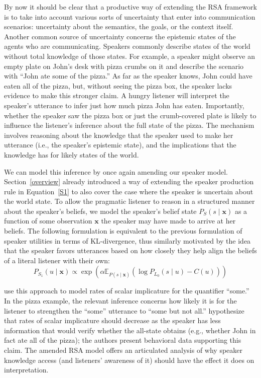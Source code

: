 \documentclass[10pt,letterpaper]{article}
\begin{document}
By now it should be clear that a productive way of extending the RSA framework is to take into account various sorts of uncertainty that enter into communication scenarios: uncertainty about the semantics, the goals, or the context itself. Another common source of uncertainty concerns the epistemic states of the agents who are communicating. Speakers commonly describe states of the world without total knowledge of those states. For example, a speaker might observe an empty plate on John's desk with pizza crumbs on it and describe the scenario with ``John ate some of the pizza.'' As far as the speaker knows, John could have eaten all of the pizza, but, without seeing the pizza box, the speaker lacks evidence to make this stronger claim. A hungry listener will interpret the speaker's utterance to infer just how much pizza John has eaten. Importantly, whether the speaker saw the pizza box or just the crumb-covered plate is likely to influence the listener's inference about the full state of the pizza. The mechanism involves reasoning about the knowledge that the speaker used to make her utterance (i.e., the speaker's epistemic state), and the implications that the knowledge has for likely states of the world.

We can model this inference by once again amending our speaker model.
Section~\ref{overview} already introduced a way of extending the speaker production rule in Equation~\eqref{S1} to also cover the case where the speaker is uncertain about the world state.
To allow the pragmatic listener to reason in a structured manner about the speaker's beliefs, we model the speaker's belief state $P_{S}(s \mid \textbf{x})$ as a function of some observation $\textbf{x}$ the speaker may have made to arrive at her beliefs.
The following formulation is equivalent to the previous formulation of speaker utilities in terms of KL-divergence, thus similarly motivated by the idea that the speaker favors utterances based on how closely they help align the beliefs of a literal listener with their own:
%
\begin{equation} \label{S1-epistemic}
P_{S_1}(u\mid \textbf{x}) \propto \exp (\alpha \mathbb{E}_{P(s\mid \textbf{x})}(\log P_{L_0}(s\mid u) - C(u)))
\end{equation}

\cite{goodmanstuhlmuller2013} use this approach to model rates of scalar implicature for the quantifier ``some.'' In the pizza example, the relevant inference concerns how likely it is for the listener to strengthen the ``some'' utterance to ``some but not all.'' \cite{goodmanstuhlmuller2013} hypothesize that rates of scalar implicature should decrease as the speaker has less information that would verify whether the all-state obtains (e.g., whether John in fact ate all of the pizza); the authors present behavioral data supporting this claim. The amended RSA model offers an articulated analysis of why speaker knowledge access (and listeners' awareness of it) should have the effect it does on interpretation.
\end{document}
